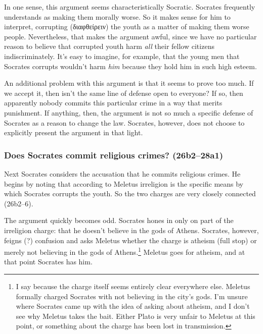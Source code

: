 \documentclass[11pt]{article}
\begin{document}
In one sense, this argument seems characteristically Socratic.  Socrates
frequently understands  as making them morally worse.
So it makes sense for him to interpret, corrupting ({\g διαφθείρειν}) the youth
as a matter of making them worse people.  Nevertheless, that makes the argument
awful, since we have no particular reason to believe that corrupted youth harm
\emph{all} their fellow citizens indiscriminately.  It's easy to imagine, for
example, that the young men that Socrates corrupts wouldn't harm \emph{him}
because they hold him in such high esteem.

An additional problem with this argument is that it seems to prove too much.
If we accept it, then isn't the same line of defense open to everyone?  If so,
then apparently nobody commits this particular crime in a way that merits
punishment.  If anything, then, the argument is not so much a specific defense
of Socrates as a reason to change the law.  Socrates, however, does not choose
to explicitly present the argument in that light.


\subsubsection{Does Socrates commit religious crimes? (26b2--28a1)}

Next Socrates considers the accusation that he commits religious crimes.  He
begins by noting that according to Meletus irreligion is the specific means by
which Socrates corrupts the youth.  So the two charges are very closely
connected (26b2--6).

The argument quickly becomes odd. Socrates hones in only on part of the
irreligion charge: that he doesn't believe in the gods of Athens.  Socrates,
however, feigns (?) confusion and asks Meletus whether the charge is atheism
(full stop) or merely not believing in the gods of Athens.\footnote{I say
 because the charge itself seems entirely clear everywhere else.
Meletus formally charged Socrates with not believing in the city's gods.  I'm
unsure where Socrates came up with the idea of asking about atheism, and
I don't see why Meletus takes the bait.  Either Plato is very unfair to Meletus
at this point, or something about the charge has been lost in transmission.}
Meletus goes for atheism, and at that point Socrates has him.
\end{document}
